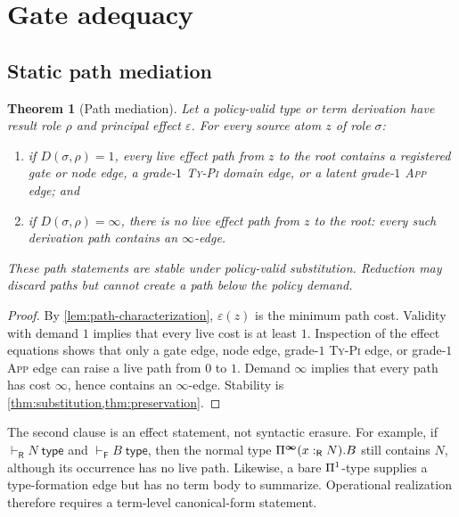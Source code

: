\documentclass[11pt]{article}
\numberwithin{equation}{section}
\theoremstyle{definition}
\theoremstyle{plain}
\newtheorem{theorem}[definition]{Theorem}
\theoremstyle{remark}
\newcommand{\Frm}{\mathsf F}
\newcommand{\Ren}{\mathsf R}
\newcommand{\eps}{\varepsilon}
\newcommand{\absent}{\boldsymbol\infty}
\newcommand{\jtype}{\mathrel{\mathsf{type}}}
\begin{document}
\section{Gate adequacy}\label{sec:adequacy}

\subsection{Static path mediation}

\begin{theorem}[Path mediation]\label{thm:mediation}
Let a policy-valid type or term derivation have result role \(\rho\) and
principal effect \(\eps\).  For every source atom \(z\) of role \(\sigma\):
\begin{enumerate}[label=(\roman*),leftmargin=2.5em]
\item if \(D(\sigma,\rho)=1\), every live effect path from \(z\) to the root
contains a registered gate or node edge, a grade-\(1\)
\textnormal{\textsc{Ty-Pi}} domain
edge, or a latent grade-\(1\) \textnormal{\textsc{App}} edge; and
\item if \(D(\sigma,\rho)=\absent\), there is no live effect path from \(z\)
to the root: every such derivation path contains an \(\absent\)-edge.
\end{enumerate}
These path statements are stable under policy-valid substitution.  Reduction
may discard paths but cannot create a path below the policy demand.
\end{theorem}

\begin{proof}
By \cref{lem:path-characterization}, \(\eps(z)\) is the minimum path cost.
Validity with demand \(1\) implies that every live cost is at least \(1\).
Inspection of the effect equations shows that only a gate edge, node edge,
grade-\(1\) \textsc{Ty-Pi} edge, or grade-\(1\) \textsc{App} edge can raise a
live path from \(0\) to \(1\).  Demand \(\absent\) implies that every path has
cost \(\absent\), hence contains an \(\absent\)-edge.  Stability is
\cref{thm:substitution,thm:preservation}.
\end{proof}

The second clause is an effect statement, not syntactic erasure.  For example,
if \(\vdash_{\Ren}N\;\jtype\) and \(\vdash_{\Frm}B\;\jtype\), then the normal type
\(
  \AFDepFun^{\absent}(x:_{\Ren}N).B
\)
still contains \(N\), although its occurrence has no live path.  Likewise, a
bare \(\Pi^1\)-type supplies a type-formation edge but has no term body to
summarize.  Operational realization therefore requires a term-level
canonical-form statement.
\end{document}
